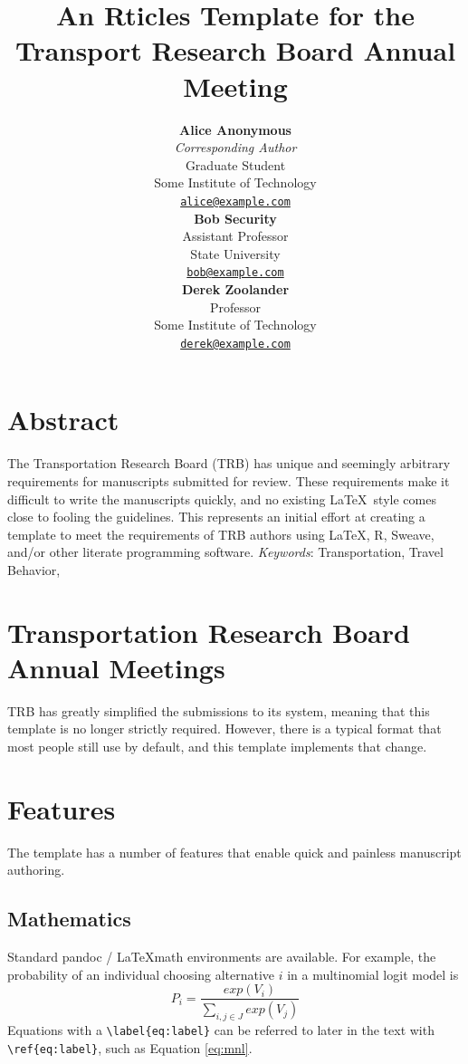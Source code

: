 \documentclass[numbered]{trbunofficial}
\title{An Rticles Template for the Transport Research Board Annual
Meeting}
\author{%
    \textbf{Alice Anonymous}\\\textit{Corresponding Author}\\
  Graduate Student\\
  Some Institute of Technology\\
  \href{mailto:alice@example.com}{\nolinkurl{alice@example.com}}\\
  \hfill\break
    \textbf{Bob Security}\\
  Assistant Professor\\
  State University\\
  \href{mailto:bob@example.com}{\nolinkurl{bob@example.com}}\\
  \hfill\break
    \textbf{Derek Zoolander}\\
  Professor\\
  Some Institute of Technology\\
  \href{mailto:derek@example.com}{\nolinkurl{derek@example.com}}\\
  \hfill\break
  }
\begin{document}
\maketitle


\section{Abstract}
The Transportation Research Board (TRB) has unique and seemingly
arbitrary requirements for manuscripts submitted for review. These
requirements make it difficult to write the manuscripts quickly, and no
existing \LaTeX~style comes close to fooling the guidelines. This
represents an initial effort at creating a template to meet the
requirements of TRB authors using \LaTeX, R, Sweave, and/or other
literate programming software.
\hfill\break%
\hfill\break%
\noindent\textit{Keywords}:  Transportation, Travel Behavior,  
\newpage

\section{Transportation Research Board Annual
Meetings}\label{transportation-research-board-annual-meetings}

TRB has greatly simplified the submissions to its system, meaning that
this template is no longer strictly required. However, there is a
typical format that most people still use by default, and this template
implements that change.

\section{Features}\label{features}

The template has a number of features that enable quick and painless
manuscript authoring.

\subsection{Mathematics}\label{mathematics}

Standard pandoc / \LaTeX math environments are available. For example,
the probability of an individual choosing alternative \(i\) in a
multinomial logit model is \begin{equation}
  P_i = \frac{exp(V_i)}{\sum_{i, j \in J}exp(V_j)} \label{eq:mnl}
\end{equation} Equations with a
\texttt{\textbackslash{}label\{eq:label\}} can be referred to later in
the text with \texttt{\textbackslash{}ref\{eq:label\}}, such as Equation
\ref{eq:mnl}.
\end{document}
